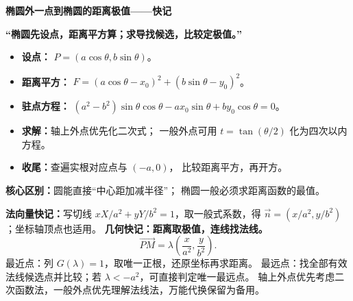 \begin{summarybox}
\textbf{椭圆外一点到椭圆的距离极值——快记}

\begin{center}
\textbf{“椭圆先设点，距离平方算；求导找候选，比较定极值。”}
\end{center}

\begin{itemize}
  \item \textbf{设点：}
  $P=(a\cos\theta,b\sin\theta)$。
  \item \textbf{距离平方：}
  $F=(a\cos\theta-x_0)^2+(b\sin\theta-y_0)^2$。
  \item \textbf{驻点方程：}
  $(a^2-b^2)\sin\theta\cos\theta
   -ax_0\sin\theta+by_0\cos\theta=0$。
  \item \textbf{求解：}轴上外点优先化二次式；
  一般外点可用 $t=\tan(\theta/2)$ 化为四次以内方程。
  \item \textbf{收尾：}查遍实根对应点与 $(-a,0)$，
  比较距离平方，再开方。
\end{itemize}

\textbf{核心区别：}圆能直接“中心距加减半径”；
椭圆一般必须求距离函数的最值。

\medskip\textbf{法向量快记：}写切线 $xX/a^2+yY/b^2=1$，取一般式系数，得 $\vec n=(x/a^2,y/b^2)$；坐标轴顶点也适用。
\medskip\textbf{几何快记：距离取极值，连线找法线。}
\[
\overrightarrow{PM}=\lambda\left(\frac{x}{a^2},\frac{y}{b^2}\right).
\]
最近点：列 $G(\lambda)=1$，取唯一正根，还原坐标再求距离。
最远点：找全部有效法线候选点并比较；若 $\lambda<-a^2$，可直接判定唯一最远点。
轴上外点优先考虑二次函数法，一般外点优先理解法线法，万能代换保留为备用。

\end{summarybox}
